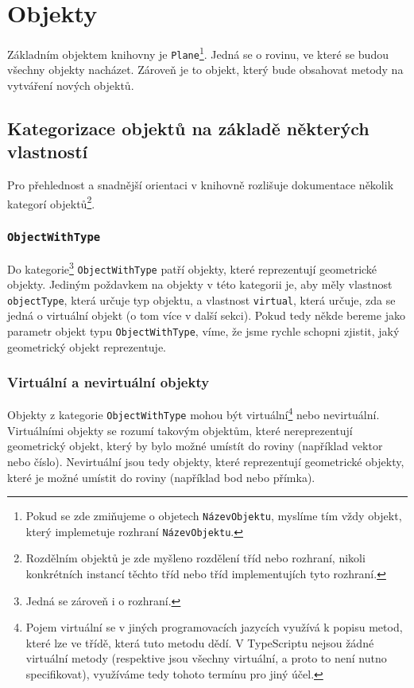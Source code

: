 \chapter{Objekty}
\label{chapter:objects}

Základním objektem knihovny je \texttt{Plane}\footnote{Pokud se zde zmiňujeme o objetech \texttt{NázevObjektu}, myslíme tím vždy objekt, který implemetuje rozhraní \texttt{NázevObjektu}.}\cite{geometryjs:source:interfaces:plane.ts}. 
Jedná se o rovinu, ve které se budou všechny objekty nacházet.
Zároveň je to objekt, který bude obsahovat metody na vytváření nových objektů\cite{geometryjs:wiki:geometryObjects}.

\section[Kategorizace]{Kategorizace objektů na základě některých vlastností}
\label{sec:object-categorization}

Pro přehlednost a snadnější orientaci v knihovně rozlišuje dokumentace několik kategorí objektů\footnote{Rozdělním objektů je zde myšleno rozdělení tříd nebo rozhraní, nikoli konkrétních instancí těchto tříd nebo tříd implementujích tyto rozhraní.}.

\subsection[ObjectWithType]{\texttt{ObjectWithType}}
\label{subsec:object-with-type}

Do kategorie\footnote{Jedná se zároveň i o rozhraní.} \texttt{ObjectWithType} patří objekty, které reprezentují geometrické objekty. 
Jediným poždavkem na objekty v této kategorii je, aby měly vlastnost \texttt{objectType}, která určuje typ objektu, a vlastnost \texttt{virtual}, která určuje, zda se jedná o virtuální objekt (o tom více v další sekci).
Pokud tedy někde bereme jako parametr objekt typu \texttt{ObjectWithType}, víme, že jsme rychle schopni zjistit, jaký geometrický objekt reprezentuje.

\subsection[Virtuální a nevirtuální]{Virtuální a nevirtuální objekty}
\label{subsec:virtual-and-non-virtual}

Objekty z kategorie \texttt{ObjectWithType} mohou být virtuální\footnote{Pojem virtuální se v jiných programovacích jazycích využívá k popisu metod, které lze  ve třídě, která tuto metodu dědí. V TypeScriptu nejsou žádné virtuální metody (respektive jsou všechny virtuální, a proto to není nutno specifikovat), využíváme tedy tohoto termínu pro jiný účel.} nebo nevirtuální.
Virtuálními objekty se rozumí takovým objektům, které nereprezentují geometrický objekt, který by bylo možné umístít do roviny (například vektor nebo číslo).
Nevirtuální jsou tedy objekty, které reprezentují geometrické objekty, které je možné umístit do roviny (například bod nebo přímka).

